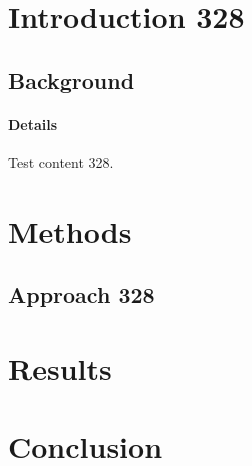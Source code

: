 \documentclass{article}
\begin{document}
\section{Introduction 328}
\subsection{Background}
\paragraph{Details} Test content 328.
\section{Methods}
\subsection{Approach 328}
\section{Results}
\section{Conclusion}
\end{document}
